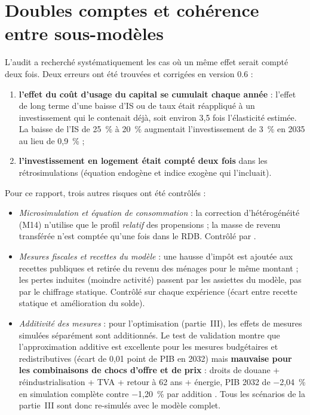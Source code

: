\section{Doubles comptes et cohérence entre sous-modèles}

L'audit a recherché systématiquement les cas où un même effet serait compté deux fois. Deux erreurs ont été trouvées et
corrigées en version 0.6  :
\begin{enumerate}
\item \textbf{l'effet du coût d'usage du capital se cumulait chaque année} : l'effet de long terme d'une baisse d'IS ou
de taux était réappliqué à un investissement qui le contenait déjà, soit environ 3,5 fois l'élasticité estimée. La
baisse de l'IS de 25~\% à 20~\% augmentait l'investissement de 3~\% en 2035 au lieu de 0,9~\% ;
\item \textbf{l'investissement en logement était compté deux fois} dans les rétrosimulations (équation endogène et
indice exogène qui l'incluait).
\end{enumerate}
Pour ce rapport, trois autres risques ont été contrôlés :
\begin{itemize}
\item \emph{Microsimulation et équation de consommation} : la correction d'hétérogénéité (M14) n'utilise que le profil
\emph{relatif} des propensions ; la masse de revenu transférée n'est comptée qu'une fois dans le RDB. Contrôlé par
.
\item \emph{Mesures fiscales et recettes du modèle} : une hausse d'impôt est ajoutée aux recettes publiques et retirée
du revenu des ménages pour le même montant ; les pertes induites (moindre activité) passent par les assiettes du modèle,
pas par le chiffrage statique. Contrôlé sur chaque expérience (écart entre recette statique et amélioration du solde).
\item \emph{Additivité des mesures} : pour l'optimisation (partie~III), les effets de mesures simulées séparément sont
additionnés. Le test de validation montre que l'approximation additive est excellente pour les mesures budgétaires et
redistributives (écart de 0,01 point de PIB en 2032) mais \textbf{mauvaise pour les combinaisons de chocs d'offre et de
prix} : droits de douane + réindustrialisation + TVA + retour à 62 ans + énergie, PIB 2032 de $-$2,04~\% en simulation
complète contre $-$1,20~\% par addition . Tous les scénarios de la partie~III sont donc
re-simulés avec le modèle complet.
\end{itemize}

